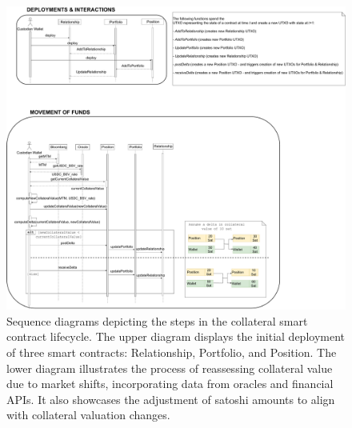 \begin{figure}
    \centering
    \includegraphics[angle=90, height=\textheight, width=\textwidth]{images/chapter 3/sequenceDiagram.drawio.pdf}
    \caption[Sequence Diagram]{Sequence diagrams depicting the steps in the collateral smart contract lifecycle. The upper diagram displays the initial deployment of three smart contracts: Relationship, Portfolio, and Position. The lower diagram illustrates the process of reassessing collateral value due to market shifts, incorporating data from oracles and financial APIs. It also showcases the adjustment of satoshi amounts to align with collateral valuation changes.}
    \label{fig:sequence-diagram}
\end{figure}
\restoregeometry
